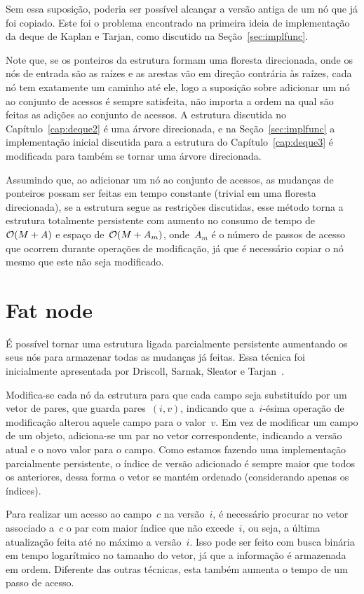 \documentclass[../../main.tex]{subfiles}
\begin{document}
Sem essa suposição, poderia ser possível alcançar a versão antiga de um nó que já foi copiado. Este foi o problema encontrado na primeira ideia de implementação da deque de Kaplan e Tarjan, como discutido na Seção~\ref{sec:implfunc}.

Note que, se os ponteiros da estrutura formam uma floresta direcionada, onde os nós de entrada são as raízes e as arestas vão em direção contrária às raízes, cada nó tem exatamente um caminho até ele, logo a suposição sobre adicionar um nó ao conjunto de acessos é sempre satisfeita, não importa a ordem na qual são feitas as adições ao conjunto de acessos. A estrutura discutida no Capítulo~\ref{cap:deque2} é uma árvore direcionada, e na Seção~\ref{sec:implfunc} a implementação inicial discutida para a estrutura do Capítulo~\ref{cap:deque3} é modificada para também se tornar uma árvore direcionada.

Assumindo que, ao adicionar um nó ao conjunto de acessos, as mudanças de ponteiros possam ser feitas em tempo constante (trivial em uma floresta direcionada), se a estrutura segue as restrições discutidas, esse método torna a estrutura totalmente persistente com aumento no consumo de tempo de~$\mathcal{O}(M+A)$ e espaço de~$\mathcal{O}(M+A_m)$, onde~$A_m$ é o número de passos de acesso que ocorrem durante operações de modificação, já que é necessário copiar o nó mesmo que este não seja modificado.


\section{Fat node}

É possível tornar uma estrutura ligada parcialmente persistente aumentando os seus nós para armazenar todas as mudanças já feitas. Essa técnica foi inicialmente apresentada por Driscoll, Sarnak, Sleator e Tarjan~\cite{DriscollSST1989}.

Modifica-se cada nó da estrutura para que cada campo seja substituído por um vetor de pares, que guarda pares~$(i, v)$, indicando que a~$i$-ésima operação de modificação alterou aquele campo para o valor~$v$. Em vez de modificar um campo de um objeto, adiciona-se um par no vetor correspondente, indicando a versão atual e o novo valor para o campo. Como estamos fazendo uma implementação parcialmente persistente, o índice de versão adicionado é sempre maior que todos os anteriores, dessa forma o vetor se mantém ordenado (considerando apenas os índices).

Para realizar um acesso ao campo~$c$ na versão~$i$, é necessário procurar no vetor associado a~$c$ o par com maior índice que não excede~$i$, ou seja, a última atualização feita até no máximo a versão~$i$. Isso pode ser feito com busca binária em tempo logarítmico no tamanho do vetor, já que a informação é armazenada em ordem. Diferente das outras técnicas, esta também aumenta o tempo de um passo de acesso.
\end{document}
